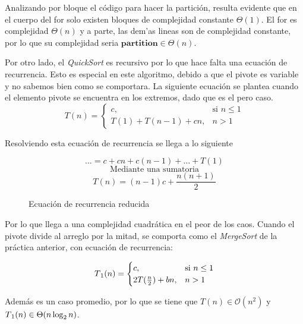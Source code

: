 \documentclass[12pt,twoside]{article}
\begin{document}
Analizando por bloque el c\'odigo para hacer la partici\'on, resulta evidente que en el cuerpo del for solo existen bloques de complejidad constante $\Theta(1)$. El for es complejidad $\Theta(n)$ y a parte, las dem'as lineas son de complejidad constante, por lo que su complejidad seria $\textbf{partition} \in \Theta(n)$.

Por otro lado, el \textit{QuickSort} es recursivo por lo que hace falta una ecuaci\'on de recurrencia. Esto es especial en este algoritmo, debido a que el pivote es variable y no sabemos bien como se comportara. La siguiente ecuaci\'on se plantea cuando el elemento pivote se encuentra en los extremos, dado que es el pero caso.
\[
    T(n) = 
\begin{cases}
    c, & \text{si } n \leq 1 \\
    T(1) + T(n-1) + cn, & n > 1
\end{cases}
\]

Resolviendo esta ecuaci\'on de recurrencia se llega a lo siguiente
\begin{figure}[ht]
    \centering
    \begin{equation}
        \dots = c + cn + c(n-1) + \dots + T(1)
    \end{equation}
    \begin{equation}
        \text{Mediante una sumatoria}
    \end{equation}
    \begin{equation}
        T(n) = (n-1)c + \frac{n(n+1)}{2}
    \end{equation}
    \caption{Ecuaci\'on de recurrencia reducida}
    \label{eq:ecuacion_recurrencia}
\end{figure}

Por lo que llega a una complejidad cuadr\'atica en el peor de los caos. Cuando el pivote divide al arreglo por la mitad, se comporta como el \textit{MergeSort} de la pr\'actica anterior, con ecuaci\'on de recurrencia: 

\[
    T\textsubscript{1}(n) = 
\begin{cases}
    c, & \text{si } n \leq 1 \\
    2T(\frac{n}{2}) + bn, & n > 1
\end{cases}
\]

Adem\'as es un caso promedio, por lo que se tiene que $T(n) \in \mathcal{O}(n^2)$ y $T\textsubscript{1}(n) \in \Theta(n\log_2 n)$.

\newpage
\vfill
\clearpage
\end{document}
